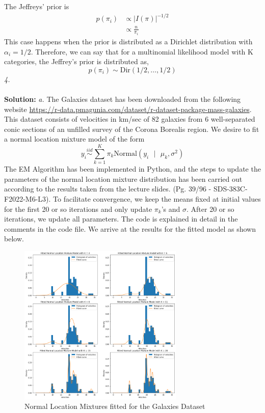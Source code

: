 \documentclass[11pt]{article}
\begin{document}
The Jeffreys' prior is
\begin{equation}
  \nonumber
  \begin{aligned}
    p(\pi_{i}) & \propto |I(\pi)|^{-1/2}\\
    & \propto \frac{n}{\pi_{i}}
  \end{aligned}
\end{equation}
This case happens when the prior is distributed as a Dirichlet distribution with $\alpha_{i} = 1/2$. Therefore, we can say that for a multinomial likelihood model with K categories, the Jeffrey's prior is distributed as,
\begin{equation}
  \nonumber
  p(\pi_{i}) \sim \text{Dir}(1/2, \dots, 1/2)
\end{equation}
\emph{4.}\\ \\
\textbf{Solution: }
\emph{a.} The Galaxies dataset has been downloaded from the following website \url{https://r-data.pmagunia.com/dataset/r-dataset-package-mass-galaxies}. This dataset consists of velocities in km/sec of 82 galaxies from 6 well-separated conic sections of an unfilled survey of the Corona Borealis region. We desire to fit a normal location mixture model of the form
\begin{equation}
  \nonumber
  y_{i} \overset{iid}{\sim} \sum_{k = 1}^{K} \pi_{k} \text{Normal}(y_{i} \text{ } | \text{ } \mu_{k}, \sigma^2)
\end{equation}
The EM Algorithm has been implemented in Python, and the steps to update the parameters of the normal location mixture distribution has been carried out according to the results taken from the lecture slides. (Pg. 39/96 - SDS-383C-F2022-M6-L3). To facilitate convergence, we keep the means fixed at initial values for the first 20 or so iterations and only update $\pi_{k}$'s and $\sigma$. After 20 or so iterations, we update all parameters. The code is explained in detail in the comments in the code file.
We arrive at the results for the fitted model as shown below.
\begin{figure}[H]
  \centering
  \includegraphics[width = 0.7\textwidth]{output.png}
  \caption{Normal Location Mixtures fitted for the Galaxies Dataset}
\end{figure}
\end{document}
